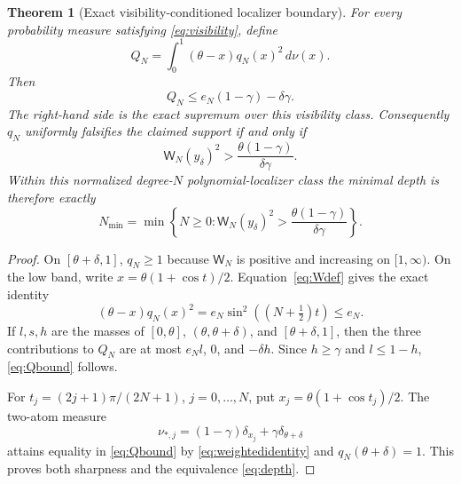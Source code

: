 \documentclass[11pt]{article}
\newtheorem{theorem}{Theorem}[section]
\theoremstyle{definition}
\theoremstyle{remark}
\begin{document}
\begin{theorem}[Exact visibility-conditioned localizer boundary]
\label{thm:cheb}
For every probability measure satisfying \eqref{eq:visibility}, define
\begin{equation}
 Q_N=\int_0^1(\theta-x)q_N(x)^2\,d\nu(x).             \label{eq:QN}
\end{equation}
Then
\begin{equation}
 Q_N\leq e_N(1-\gamma)-\delta\gamma.                 \label{eq:Qbound}
\end{equation}
The right-hand side is the exact supremum over this visibility class.
Consequently $q_N$ uniformly falsifies the claimed support if and only if
\begin{equation}
 \mathsf W_N(y_\delta)^2>
 \frac{\theta(1-\gamma)}{\delta\gamma}.               \label{eq:depth}
\end{equation}
Within this normalized degree-$N$ polynomial-localizer class the minimal
depth is therefore exactly
\begin{equation}
 N_{\min}=\min\left\{N\geq0:
 \mathsf W_N(y_\delta)^2>
 \frac{\theta(1-\gamma)}{\delta\gamma}\right\}.       \label{eq:Nexplicit}
\end{equation}
\end{theorem}

\begin{proof}
On $[\theta+\delta,1]$, $q_N\geq1$ because $\mathsf W_N$ is positive and
increasing on $[1,\infty)$.  On the low band, write
$x=\theta(1+\cos t)/2$.  Equation~\eqref{eq:Wdef} gives the exact identity
\begin{equation}
 (\theta-x)q_N(x)^2
 =e_N\sin^2((N+\tfrac12)t)\leq e_N.                  \label{eq:weightedidentity}
\end{equation}
If $l,s,h$ are the masses of $[0,\theta]$,
$(\theta,\theta+\delta)$, and $[\theta+\delta,1]$, then the three
contributions to $Q_N$ are at most $e_Nl$, $0$, and $-\delta h$.
Since $h\geq\gamma$ and $l\leq1-h$, \eqref{eq:Qbound} follows.

For $t_j=(2j+1)\pi/(2N+1)$, $j=0,\ldots,N$, put
$x_j=\theta(1+\cos t_j)/2$.  The two-atom measure
\begin{equation}
 \nu_{*,j}=(1-\gamma)\delta_{x_j}
           +\gamma\delta_{\theta+\delta}              \label{eq:extremalmeasure}
\end{equation}
attains equality in \eqref{eq:Qbound} by
\eqref{eq:weightedidentity} and $q_N(\theta+\delta)=1$.  This proves both
sharpness and the equivalence \eqref{eq:depth}.
\end{proof}
\end{document}
